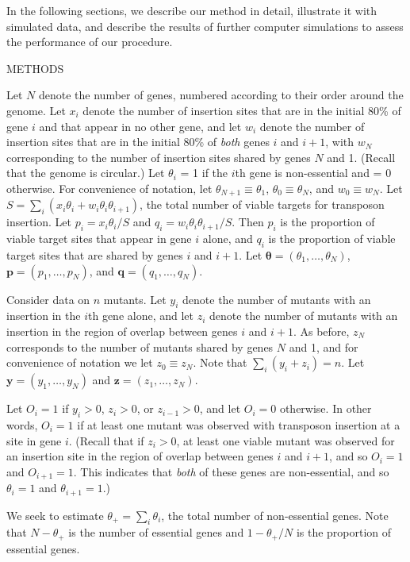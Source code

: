 \documentclass[letterpaper]{article}
\begin{document}
\begin{multicols}{2}
In the following sections, we describe our method in detail,
illustrate it with simulated data, and describe the results of further
computer simulations to assess the performance of our procedure.

\smallskip \bigskip
\centerline{METHODS}
\smallskip

Let $N$ denote the number of genes, numbered according to their order
around the genome.  Let $x_i$ denote the number of insertion sites
that are in the initial 80\% of gene $i$ and that appear in no other
gene, and let $w_i$ denote the number of insertion sites that are in
the initial 80\% of \emph{both} genes $i$ and $i+1$, with $w_N$
corresponding to the number of insertion sites shared by genes $N$ and
1. (Recall that the genome is circular.)  Let $\theta_i$ = 1 if the
$i$th gene is non-essential and = 0 otherwise.  For convenience of
notation, let $\theta_{N+1} \equiv \theta_1$, $\theta_0 \equiv
\theta_N$, and $w_0 \equiv w_N$.  Let $S = \sum_i (x_i \theta_i + w_i
\theta_i \theta_{i+1})$, the total number of viable targets for
transposon insertion.  Let $p_i = x_i \theta_i / S$ and $q_i = w_i
\theta_i \theta_{i+1} / S$.  Then $p_i$ is the proportion of viable
target sites that appear in gene $i$ alone, and $q_i$ is the
proportion of viable target sites that are shared by genes $i$ and
$i+1$.  Let $\boldsymbol{\theta} = (\theta_1, \dots, \theta_N)$,
$\boldsymbol{p} = (p_1, \dots, p_N)$, and $\boldsymbol{q} = (q_1,
\dots, q_N)$.

Consider data on $n$ mutants.  Let $y_i$ denote the number of mutants
with an insertion in the $i$th gene alone, and let $z_i$ denote the
number of mutants with an insertion in the region of overlap between
genes $i$ and $i+1$.  As before, $z_N$ corresponds to the number of
mutants shared by genes $N$ and 1, and for convenience of notation we
let $z_0 \equiv z_N$.  Note that $\sum_i (y_i + z_i) = n$.  Let
$\boldsymbol{y} = (y_1, \dots, y_N)$ and $\boldsymbol{z} = (z_1,
\dots, z_N)$.

Let $O_i = 1$ if $y_i > 0$, $z_i > 0$, or $z_{i-1} > 0$, and let $O_i
= 0$ otherwise.  In other words, $O_i = 1$ if at least one mutant was
observed with transposon insertion at a site in gene $i$.  (Recall
that if $z_i > 0$, at least one viable mutant was observed for an
insertion site in the region of overlap between genes $i$ and $i+1$,
and so $O_i = 1$ and $O_{i+1} = 1$.  This indicates that \emph{both\/}
of these genes are non-essential, and so $\theta_i = 1$ and
$\theta_{i+1}=1$.)

We seek to estimate $\theta_+ = \sum_i \theta_i$, the total number of
non-essential genes.  Note that $N-\theta_+$ is the number of
essential genes and $1 - \theta_+ / N$ is the proportion of essential
genes.


\end{multicols}
\end{document}
